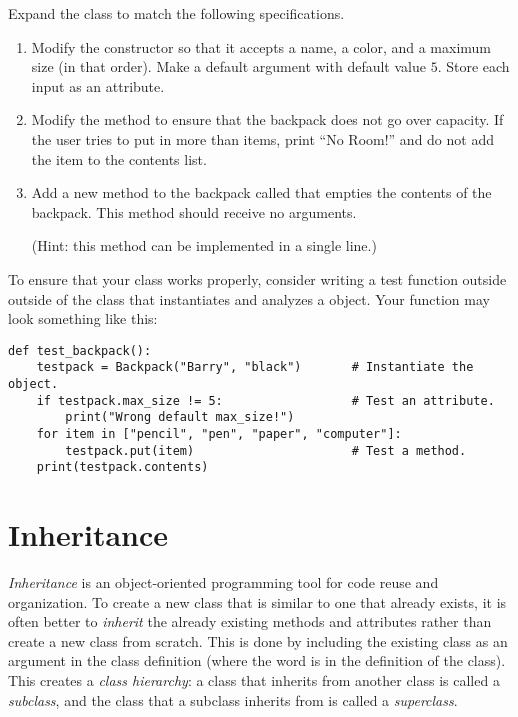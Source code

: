 \begin{problem}
Expand the  class to match the following specifications.
\begin{enumerate}
\item Modify the constructor so that it accepts a name, a color, and a maximum size (in that order).
Make  a default argument with default value $5$.
Store each input as an attribute.

\item Modify the  method to ensure that the backpack does not go over capacity.
If the user tries to put in more than  items, print ``No Room!'' and do not add the item to the contents list.

\item Add a new method to the backpack called  that empties the contents of the backpack.
This method should receive no arguments.

(Hint: this method can be implemented in a single line.)
\end{enumerate}

To ensure that your class works properly, consider writing a test function outside outside of the  class that instantiates and analyzes a  object.
Your function may look something like this:
\begin{lstlisting}
def test_backpack():
    testpack = Backpack("Barry", "black")       # Instantiate the object.
    if testpack.max_size != 5:                  # Test an attribute.
        print("Wrong default max_size!")
    for item in ["pencil", "pen", "paper", "computer"]:
        testpack.put(item)                      # Test a method.
    print(testpack.contents)
\end{lstlisting}
\end{problem}

\section*{Inheritance} %

\emph{Inheritance} is an object-oriented programming tool for code reuse and organization.
To create a new class that is similar to one that already exists, it is often better to \emph{inherit} the already existing methods and attributes rather than create a new class from scratch.
This is done by including the existing class as an argument in the class definition (where the word  is in the definition of the  class).
This creates a \emph{class hierarchy}: a class that inherits from another class is called a \emph{subclass}, and the class that a subclass inherits from is called a \emph{superclass}.

